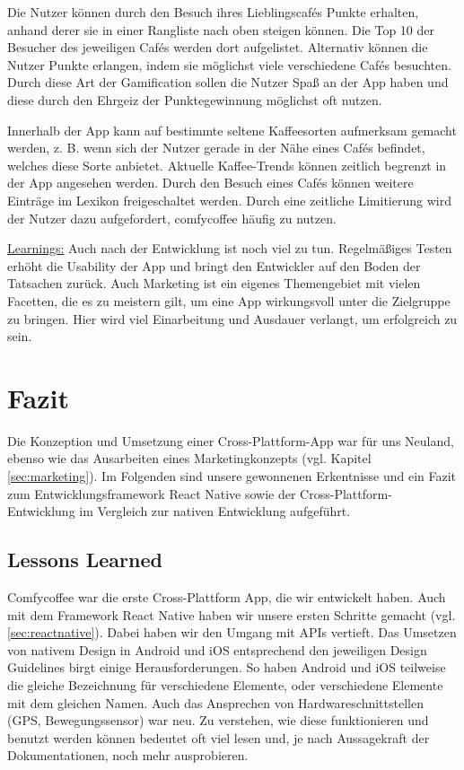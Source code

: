 Die Nutzer können durch den Besuch ihres Lieblingscafés Punkte erhalten, anhand derer sie in einer Rangliste nach oben steigen können. Die Top 10 der Besucher des jeweiligen Cafés werden dort aufgelistet. Alternativ können die Nutzer Punkte erlangen, indem sie möglichst viele verschiedene Cafés besuchten. Durch diese Art der Gamification sollen die Nutzer Spaß an der App haben und diese durch den Ehrgeiz der Punktegewinnung möglichst oft nutzen.

Innerhalb der App kann auf bestimmte seltene Kaffeesorten aufmerksam gemacht werden, z. B. wenn sich der Nutzer gerade in der Nähe eines Cafés befindet, welches diese Sorte anbietet. Aktuelle Kaffee-Trends können zeitlich begrenzt in der App angesehen werden. Durch den Besuch eines Cafés können weitere Einträge im Lexikon freigeschaltet werden. Durch eine zeitliche Limitierung wird der Nutzer dazu aufgefordert, comfycoffee häufig zu nutzen.

\underline{Learnings:}
Auch nach der Entwicklung ist noch viel zu tun. Regelmäßiges Testen erhöht die Usability der App und bringt den Entwickler auf den Boden der Tatsachen zurück. Auch Marketing ist ein eigenes Themengebiet mit vielen Facetten, die es zu meistern gilt, um eine App wirkungsvoll unter die Zielgruppe zu bringen. Hier wird viel Einarbeitung und Ausdauer verlangt, um erfolgreich zu sein.

\chapter{Fazit}
\label{fazit}
Die Konzeption und Umsetzung einer Cross-Plattform-App war für uns Neuland, ebenso wie das Ausarbeiten eines Marketingkonzepts (vgl. Kapitel \ref{sec:marketing}). Im Folgenden sind unsere gewonnenen Erkentnisse und ein Fazit zum Entwicklungsframework React Native sowie der Cross-Plattform-Entwicklung im Vergleich zur nativen Entwicklung aufgeführt.

\section{Lessons Learned}
Comfycoffee war die erste Cross-Plattform App, die wir entwickelt haben. Auch mit dem Framework React Native haben wir unsere ersten Schritte gemacht (vgl. \ref{sec:reactnative}). Dabei haben wir den Umgang mit APIs vertieft. Das Umsetzen von nativem Design in Android und iOS entsprechend den jeweiligen Design Guidelines birgt einige Herausforderungen. So haben Android und iOS teilweise die gleiche Bezeichnung für verschiedene Elemente, oder verschiedene Elemente mit dem gleichen Namen. Auch das Ansprechen von Hardwareschnittstellen (GPS, Bewegungssensor) war neu. Zu verstehen, wie diese funktionieren und benutzt werden können bedeutet oft viel lesen und, je nach Aussagekraft der Dokumentationen, noch mehr ausprobieren.

